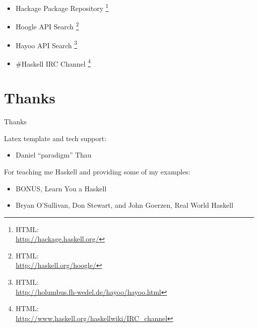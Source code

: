 \documentclass{beamer}                  %
\newcommand{\srule}{
	\rule{\textwidth}{1pt}\\
}
\newlength{\subsecwidth}
\newenvironment{slide}{
	\begin{frame} %
	\settowidth{\subsecwidth}{\insertsubsection} %
	\ifthenelse{\dimtest{\subsecwidth}{<}{1pt}}{ %
		\frametitle{\insertsection\\             %
		\vspace{-1ex}                            %
		\color{fore}\srule                       %
		\par                                     %
		\vspace{-3ex}                            %
		}
	}{                                           %
		\frametitle{\insertsection\ -- \insertsubsection\\ %
		\vspace{-1ex}                            %
		\color{fore}\srule                       %
		\par                                     %
		\vspace{-3ex}                            %
		}
	}
	\Large                                       %
}{
	\end{frame}
}
\newcommand{\titleslide}[1]{
	\section{#1}             %
	\begin{slide}
		\begin{center}
			\color{comments}
			\Huge            %
			#1               %
		\end{center}
	\end{slide}
}
\renewcommand{\thefootnote}{\fnsymbol{footnote}} %
\begin{document}
\renewcommand{\thefootnote}{\arabic{footnote}} %
\setcounter{footnote}{0}                       %
\begin{slide}
  \begin{itemize}
    \normalsize

  \item Hackage Package Repository
    \footnote{
      HTML:\\ \url{http://hackage.haskell.org/}
    }

  \item Hoogle API Search
    \footnote{
      HTML:\\ \url{http://haskell.org/hoogle/}
    }

  \item Hayoo API Search
    \footnote{
      HTML:\\ \url{http://holumbus.fh-wedel.de/hayoo/hayoo.html}
    }

  \item \#Haskell IRC Channel
    \footnote{
      HTML:\\ \url{http://www.haskell.org/haskellwiki/IRC_channel}
    }

  \end{itemize}
\end{slide}

\titleslide{Thanks}
\begin{slide}
  Latex template and tech support:
  \begin{itemize}
    \item Daniel ``paradigm'' Thau
  \end{itemize}
  For teaching me Haskell and providing some of my examples:
  \begin{itemize}
    \item BONUS, Learn You a Haskell
    \item Bryan O'Sullivan, Don Stewart, and John Goerzen, Real World Haskell
  \end{itemize}
\end{slide}
\end{document}
